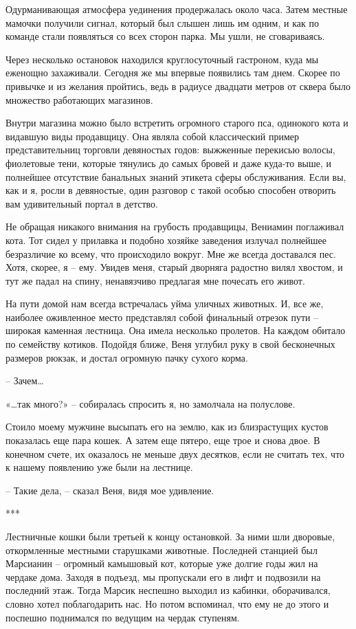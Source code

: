 \documentclass[
]{book}
\begin{document}
Одурманивающая атмосфера уединения продержалась около часа. Затем местные мамочки получили сигнал, который был слышен лишь им одним, и как по команде стали появляться со всех сторон парка. Мы ушли, не сговариваясь.

Через несколько остановок находился круглосуточный гастроном, куда мы еженощно захаживали. Сегодня же мы впервые появились там днем. Скорее по привычке и из желания пройтись, ведь в радиусе двадцати метров от сквера было множество работающих магазинов.

Внутри магазина можно было встретить огромного старого пса, одинокого кота и видавшую виды продавщицу. Она являла собой классический пример представительниц торговли девяностых годов: выжженные перекисью волосы, фиолетовые тени, которые тянулись до самых бровей и даже куда-то выше, и полнейшее отсутствие банальных знаний этикета сферы обслуживания. Если вы, как и я, росли в девяностые, один разговор с такой особью способен отворить вам удивительный портал в детство.

Не обращая никакого внимания на грубость продавщицы, Вениамин поглаживал кота. Тот сидел у прилавка и подобно хозяйке заведения излучал полнейшее безразличие ко всему, что происходило вокруг. Мне же всегда доставался пес. Хотя, скорее, я -- ему. Увидев меня, старый дворняга радостно вилял хвостом, и тут же падал на спину, ненавязчиво предлагая мне почесать его живот.

На пути домой нам всегда встречалась уйма уличных животных. И, все же, наиболее оживленное место представлял собой финальный отрезок пути -- широкая каменная лестница. Она имела несколько пролетов. На каждом обитало по семейству котиков. Подойдя ближе, Веня углубил руку в свой бесконечных размеров рюкзак, и достал огромную пачку сухого корма.

-- Зачем\ldots{}

«\ldots так много?» -- собиралась спросить я, но замолчала на полуслове.

Стоило моему мужчине высыпать его на землю, как из близрастущих кустов показалась еще пара кошек. А затем еще пятеро, еще трое и снова двое. В конечном счете, их оказалось не меньше двух десятков, если не считать тех, что к нашему появлению уже были на лестнице.

-- Такие дела, -- сказал Веня, видя мое удивление.

***

Лестничные кошки были третьей к концу остановкой. За ними шли дворовые, откормленные местными старушками животные. Последней станцией был Марсианин -- огромный камышовый кот, которые уже долгие годы жил на чердаке дома. Заходя в подъезд, мы пропускали его в лифт и подвозили на последний этаж. Тогда Марсик неспешно выходил из кабинки, оборачивался, словно хотел поблагодарить нас. Но потом вспоминал, что ему не до этого и поспешно поднимался по ведущим на чердак ступеням.
\end{document}
